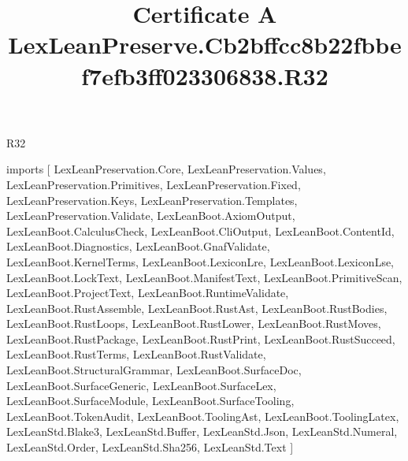 \begin{lexlean}{R32}
\title{Certificate A LexLeanPreserve.Cb2bffcc8b22fbbef7efb3ff023306838.R32}
\begin{coremodule}
imports [
  LexLeanPreservation.Core,
  LexLeanPreservation.Values,
  LexLeanPreservation.Primitives,
  LexLeanPreservation.Fixed,
  LexLeanPreservation.Keys,
  LexLeanPreservation.Templates,
  LexLeanPreservation.Validate,
  LexLeanBoot.AxiomOutput,
  LexLeanBoot.CalculusCheck,
  LexLeanBoot.CliOutput,
  LexLeanBoot.ContentId,
  LexLeanBoot.Diagnostics,
  LexLeanBoot.GnafValidate,
  LexLeanBoot.KernelTerms,
  LexLeanBoot.LexiconLre,
  LexLeanBoot.LexiconLse,
  LexLeanBoot.LockText,
  LexLeanBoot.ManifestText,
  LexLeanBoot.PrimitiveScan,
  LexLeanBoot.ProjectText,
  LexLeanBoot.RuntimeValidate,
  LexLeanBoot.RustAssemble,
  LexLeanBoot.RustAst,
  LexLeanBoot.RustBodies,
  LexLeanBoot.RustLoops,
  LexLeanBoot.RustLower,
  LexLeanBoot.RustMoves,
  LexLeanBoot.RustPackage,
  LexLeanBoot.RustPrint,
  LexLeanBoot.RustSucceed,
  LexLeanBoot.RustTerms,
  LexLeanBoot.RustValidate,
  LexLeanBoot.StructuralGrammar,
  LexLeanBoot.SurfaceDoc,
  LexLeanBoot.SurfaceGeneric,
  LexLeanBoot.SurfaceLex,
  LexLeanBoot.SurfaceModule,
  LexLeanBoot.SurfaceTooling,
  LexLeanBoot.TokenAudit,
  LexLeanBoot.ToolingAst,
  LexLeanBoot.ToolingLatex,
  LexLeanStd.Blake3,
  LexLeanStd.Buffer,
  LexLeanStd.Json,
  LexLeanStd.Numeral,
  LexLeanStd.Order,
  LexLeanStd.Sha256,
  LexLeanStd.Text
]


\end{coremodule}
\end{lexlean}
